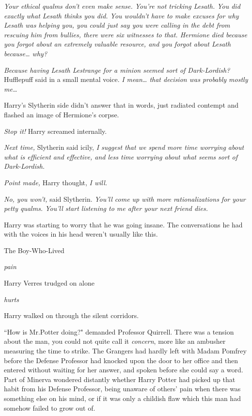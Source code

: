 \emph{Your ethical qualms don't even make sense. You're not tricking Lesath. You did exactly what Lesath thinks you did. You wouldn't have to make excuses for why Lesath was helping you, you could just say you were calling in the debt from rescuing him from bullies, there were six witnesses to that. Hermione died because you forgot about an extremely valuable resource, and you forgot about Lesath because{\ldots} why?}

\emph{Because having Lesath Lestrange for a minion seemed sort of Dark-Lordish?} Hufflepuff said in a small mental voice. \emph{I mean{\ldots} that decision was probably mostly me{\ldots}}

Harry's Slytherin side didn't answer that in words, just radiated contempt and flashed an image of Hermione's corpse.

\emph{Stop it!} Harry screamed internally.

\emph{Next time,} Slytherin said icily, \emph{I suggest that we spend more time worrying about what is efficient and effective, and less time worrying about what seems sort of Dark-Lordish.}

\emph{Point made,} Harry thought, \emph{I will.}

\emph{No, you won't,} said Slytherin. \emph{You'll come up with more rationalizations for your petty qualms. You'll start listening to me after your \emph{next} friend dies.}

Harry was starting to worry that he was going insane. The conversations he had with the voices in his head weren't usually like this.

The Boy-Who-Lived

\emph{pain}

Harry Verres trudged on alone

\emph{hurts}

Harry walked on through the silent corridors.

\later

``How is Mr.\?Potter doing?" demanded Professor Quirrell. There was a tension about the man, you could not quite call it \emph{concern}, more like an ambusher measuring the time to strike. The Grangers had hardly left with Madam Pomfrey before the Defense Professor had knocked upon the door to her office and then entered without waiting for her answer, and spoken before she could say a word. Part of Minerva wondered distantly whether Harry Potter had picked up that habit from his Defense Professor, being unaware of others' pain when there was something else on his mind, or if it was only a childish flaw which this man had somehow failed to grow out of.

